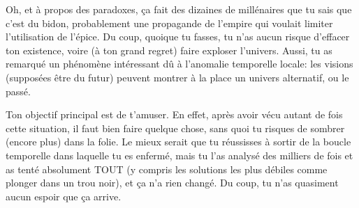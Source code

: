 {	\par Oh, et à propos des paradoxes, ça fait des dizaines de millénaires que tu sais que c'est du bidon, probablement une propagande de l'empire qui voulait limiter l'utilisation de l'épice. Du coup, quoique tu fasses, tu n'as aucun risque d'effacer ton existence, voire (à ton grand regret) faire exploser l'univers. Aussi, tu as remarqué un phénomène intéressant dû à l'anomalie temporelle locale: les visions (supposées être du futur) peuvent montrer à la place un univers alternatif, ou le passé.
	
	\par Ton objectif principal est de t'amuser. En effet, après avoir vécu autant de fois cette situation, il faut bien faire quelque chose, sans quoi tu risques de sombrer (encore plus) dans la folie. Le mieux serait que tu réussisses à sortir de la boucle temporelle dans laquelle tu es enfermé, mais tu l'as analysé des milliers de fois et as tenté absolument TOUT (y compris les solutions les plus débiles comme plonger dans un trou noir), et ça n'a rien changé. Du coup, tu n'as quasiment aucun espoir que ça arrive.
	
	
	
}
